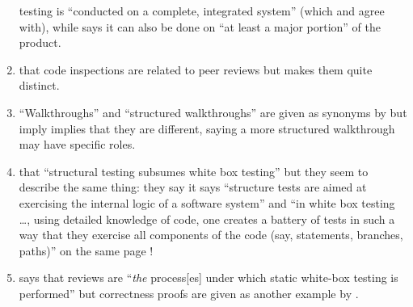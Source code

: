 \begin{enumerate}
          testing is ``conducted on a complete, integrated system'' (which
          \citet[Tab.~12.3]{PetersAndPedrycz2000} and
          \citet[p.~439]{vanVliet2000} agree with), while
          \citet[p.~109]{Patton2006} says it can also be done on ``at least a
          major portion'' of the product.
    \item %
           \citetISTQB{}  that code inspections
          are related to peer reviews but \citet[pp.~94-95]{Patton2006} makes
          them quite distinct.
    \item %
           \label{walkthrough-syns}
          ``Walkthroughs'' and ``structured walkthroughs'' are given
          as synonyms by \citetISTQB{} but \citet[p.~484]{PetersAndPedrycz2000}
          \ifnotpaper imply \else implies \fi that they are different, saying a
          more structured walkthrough may have specific roles.
    \item %
           \citeauthor{PetersAndPedrycz2000} 
          that ``structural testing
          subsumes white box testing'' but they seem to describe the same thing:
          \ifnotpaper they say \else it says \fi ``structure tests are aimed at
          exercising the internal logic of a software system'' and ``in white box
          testing \dots, using detailed knowledge of code, one creates a battery of
          tests in such a way that they exercise all components of the code
          (say, statements, branches, paths)'' on the same page
          \citeyearpar[p.~447]{PetersAndPedrycz2000}!
    \item %
           \citet[p.~92\ifnotpaper, emphasis added\fi]{Patton2006}
          says that reviews are ``\emph{the} process[es] under which static
          white-box testing is performed'' but correctness proofs are given
          as another example by \citet[pp.~418-419]{vanVliet2000}.


\end{enumerate}
